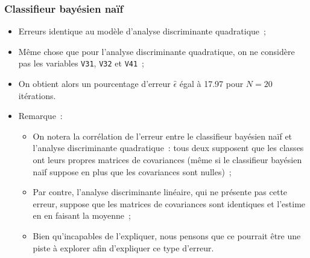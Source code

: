 \documentclass[a4paper,10pt]{report}
\begin{document}
\subsubsection{Classifieur bayésien naïf}
\begin{itemize}
	\item Erreurs identique au modèle d'analyse discriminante quadratique~;
	\item Même chose que pour l'analyse discriminante quadratique, on ne considère pas les variables \texttt{V31}, \texttt{V32} et \texttt{V41}~;
	\item On obtient alors un pourcentage d'erreur $\hat{\epsilon}$ égal à 17.97 pour $N = 20$ itérations.
	\item Remarque~:
	\begin{itemize}
		\item On notera la corrélation de l'erreur entre le classifieur bayésien naïf et l'analyse discriminante quadratique~: tous deux supposent que les classes ont leurs propres matrices de covariances (même si le classifieur bayésien naïf suppose en plus que les covariances sont nulles)~;
		\item Par contre, l'analyse discriminante linéaire, qui ne présente pas cette erreur, suppose que les matrices de covariances sont identiques et l'estime en en faisant la moyenne~;
		\item Bien qu'incapables de l'expliquer, nous pensons que ce pourrait être une piste à explorer afin d'expliquer ce type d'erreur.
	\end{itemize}
\end{itemize}
\end{document}
